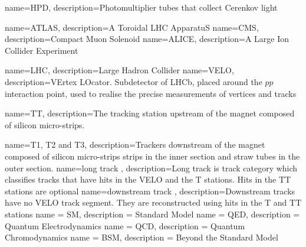 		{
		name=HPD,
		description={Photomultiplier tubes that collect Cerenkov light}
		}
                 
                 {
                   name=ATLAS,
                   description={A Toroidal LHC ApparatuS}
                 }
                 {
                   name=CMS,
                   description={Compact Muon Solenoid}
                 }
                 {
                   name=ALICE,
                   description={A Large Ion Collider Experiment}
                 }

                 {
                   name=LHC,
                   description={Large Hadron Collider}
                 }
                 {
                   name=VELO,
                   description={VErtex LOcator. Subdetector of LHCb, placed around the $pp$ interaction point, used to realise the precise measurements of vertices and tracks}
                 }

	{
                   name=TT,
                   description={The tracking station upstream of the magnet composed of silicon micro-strips.}
        }


                 {
                   name=T1{,} T2 and T3,
                   description={Trackers downstream of the magnet composed of silicon micro-strips strips in the inner section and straw tubes in the outer section.}
                 }
              {
                   name=long track ,
                   description={Long track is track category which classifies tracks that have hits in the VELO and the T stations. Hits in the TT stations are optional}
              }
              {
                   name=downstream track ,
                   description={Downstream tracks have no VELO track segment. They are reconstructed using hits in the T and TT stations}
              }
                 {      
                 name = SM,
                 description = {Standard Model}     
                 }
                 {      
                 name = QED,
                 description = {Quantum Electrodynamics}     
                 }
                 {      
                 name = QCD,
                 description = {Quantum Chromodynamics}     
                 }
                 {      
                 name = BSM,
                 description = {Beyond the Standard Model}     
                 }
                  
